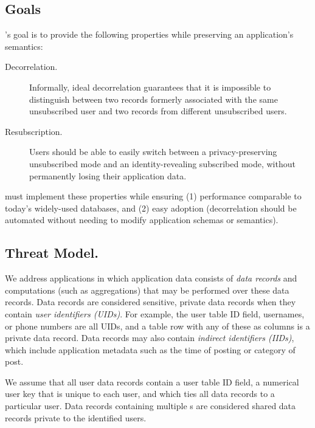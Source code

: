 \subsection{Goals} 
\sys's goal is to provide the following properties while preserving an application's 
semantics: 
\begin{description} 
    \item[Decorrelation.] Informally, ideal decorrelation guarantees that it is impossible to distinguish
        between two records formerly associated with the same unsubscribed user and two records from
        different unsubscribed users.  
    \item[Resubscription.] Users should be able to easily switch between a privacy-preserving unsubscribed mode 
       and an identity-revealing subscribed mode, without permanently losing their application data.  
\end{description}

\sys{} must implement these properties while ensuring (1) performance comparable to today’s
widely-used databases, and (2) easy adoption (decorrelation should be
automated without needing to modify application schemas or semantics).

\subsection{Threat Model.}
We address applications in which application data consists of \emph{data records} and computations
(such as aggregations) that may be performed over these data records. Data records are considered
sensitive, private data records when they contain \emph{user identifiers (UIDs)}. For example, the
user table ID field, usernames, or phone numbers are all UIDs, and a table row with any of
these as columns is a private data record. Data records may also contain \emph{indirect 
identifiers (IIDs)}, which include application metadata such as the time of posting or category of
post.

We assume that all user data records contain a user table ID field, a
numerical user key \uidkey{} that is unique to each user, and which ties all data records
to a particular user.
Data records containing multiple \uidkey{}s are
considered shared data records private to the identified users. 

